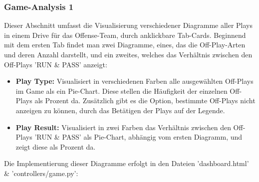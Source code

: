 \subsubsection{Game-Analysis 1}
Dieser Abschnitt umfasst die Visualisierung verschiedener Diagramme aller Plays in einem Drive für das Offense-Team, durch anklickbare Tab-Cards. Beginnend mit dem ersten Tab findet man zwei Diagramme, eines, das die Off-Play-Arten und deren Anzahl darstellt, und ein zweites, welches das Verhältnis zwischen den Off-Plays 'RUN \& PASS' anzeigt:
\begin{itemize}
    \item \textbf{Play Type:} Visualisiert in verschiedenen Farben alle ausgewählten Off-Plays im Game als ein Pie-Chart. Diese stellen die Häufigkeit der einzelnen Off-Plays als Prozent da. Zusätzlich gibt es die Option, bestimmte Off-Plays nicht anzeigen zu können, durch das Betätigen der Plays auf der Legende.
    \newpage
    \item \textbf{Play Result:} Visualisiert in zwei Farben das Verhältnis zwischen den Off-Plays 'RUN \& PASS' als Pie-Chart, abhängig vom ersten Diagramm, und zeigt diese als Prozent da. 
\end{itemize}
Die Implementierung dieser Diagramme erfolgt in den Dateien 'dashboard.html' \&  'controllers/game.py':
